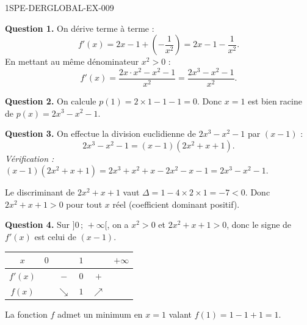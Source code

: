 \begin{corrige}{1SPE-DERGLOBAL-EX-009}

\textbf{Question 1.} On dérive terme à terme :
\[
f'(x) = 2x - 1 + \left(-\frac{1}{x^2}\right) = 2x - 1 - \frac{1}{x^2}.
\]
En mettant au même dénominateur $x^2 > 0$ :
\[
f'(x) = \frac{2x \cdot x^2 - x^2 - 1}{x^2} = \frac{2x^3 - x^2 - 1}{x^2}.
\]

\textbf{Question 2.} On calcule $p(1) = 2 \times 1 - 1 - 1 = 0$. Donc $x = 1$ est bien racine de $p(x) = 2x^3 - x^2 - 1$.

\textbf{Question 3.} On effectue la division euclidienne de $2x^3 - x^2 - 1$ par $(x - 1)$ :
\[
2x^3 - x^2 - 1 = (x-1)(2x^2 + x + 1).
\]
\textit{Vérification :} $(x-1)(2x^2 + x + 1) = 2x^3 + x^2 + x - 2x^2 - x - 1 = 2x^3 - x^2 - 1.$ \checkmark

Le discriminant de $2x^2 + x + 1$ vaut $\Delta = 1 - 4 \times 2 \times 1 = -7 < 0$. Donc $2x^2 + x + 1 > 0$ pour tout $x$ réel (coefficient dominant positif).

\textbf{Question 4.} Sur $]0\,;\,+\infty[$, on a $x^2 > 0$ et $2x^2 + x + 1 > 0$, donc le signe de $f'(x)$ est celui de $(x-1)$.

\begin{center}
\begin{tabular}{|c|ccccc|}
\hline
$x$ & $0$ & & $1$ & & $+\infty$ \\
\hline
$f'(x)$ & & $-$ & $0$ & $+$ & \\
\hline
$f(x)$ & & $\searrow$ & $1$ & $\nearrow$ & \\
\hline
\end{tabular}
\end{center}

La fonction $f$ admet un minimum en $x = 1$ valant $f(1) = 1 - 1 + 1 = 1$.
\end{corrige}
